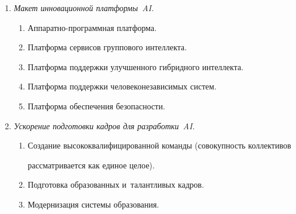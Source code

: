 \begin{enumerate}[1.]
\begin{enumerate}[{1}.1]
\begin{enumerate}[{1.2}.1]
\item Улучшенные технологии и~архитектура гибридного интеллекта.


\item Человеконезависимые и~соответствующие интеллектуальные технологии.


\item Технологии виртуальной реальности и~моделирования.


\item Разработка элементной базы для~AI.


\item Обработка естественных языков.


\end{enumerate}


\item \textit{Макет инновационной платформы~AI.}


\begin{enumerate}[{1.3}.1]


\item Аппаратно-программная платформа.


\item Платформа сервисов группового интеллекта.


\item Платформа поддержки улучшенного гибридного интеллекта.


\item Платформа поддержки человеконезависимых сис\-тем.


\item Платформа обеспечения безопас\-ности.


\end{enumerate}


\item \textit{Ускорение подготовки кадров для разработки~AI.}


\begin{enumerate}[{1.4}.1]


\item Создание высококвалифицированной команды (со\-во\-куп\-ность коллективов 


рассматривается как единое целое).


\item Подготовка образованных и~талантливых кад\-ров.


\item Модернизация системы образования.


\end{enumerate}



\end{enumerate}
\end{enumerate}
